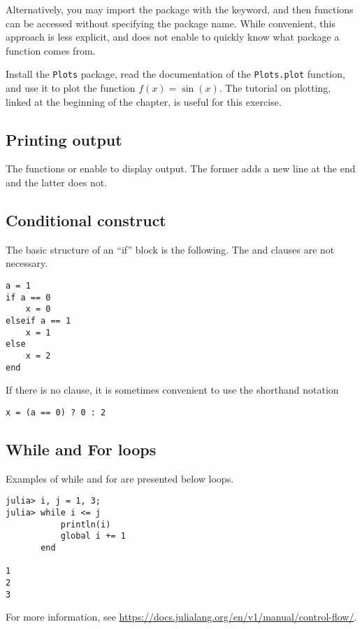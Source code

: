 Alternatively, you may import the package with the  keyword,
and then functions can be accessed without specifying the package name.
While convenient, this approach is less explicit, 
and does not enable to quickly know what package a function comes from.

\begin{exercise}
    Install the \texttt{Plots} package,
    read the documentation of the \texttt{Plots.plot} function,
    and use it to plot the function $f(x) = \sin(x)$.
    The tutorial on plotting, linked at the beginning of the chapter,
    is useful for this exercise.
\end{exercise}


\subsection*{Printing output}%
The functions  or  enable to display output.
The former adds a new line at the end and the latter does not.

\subsection*{Conditional construct}%
The basic structure of an ``if'' block is the following.
The  and  clauses are not necessary.
\begin{verbatim}
a = 1
if a == 0
    x = 0
elseif a == 1
    x = 1
else
    x = 2
end
\end{verbatim}
If there is no  clause,
it is sometimes convenient to use the shorthand notation
\begin{verbatim}
x = (a == 0) ? 0 : 2
\end{verbatim}

\subsection*{While and For loops}%

Examples of while and for are presented below loops.
\begin{verbatim}
julia> i, j = 1, 3;
julia> while i <= j
           println(i)
           global i += 1
       end

1
2
3
\end{verbatim}


For more information,
see \url{https://docs.julialang.org/en/v1/manual/control-flow/}.

\subsection*{}%


